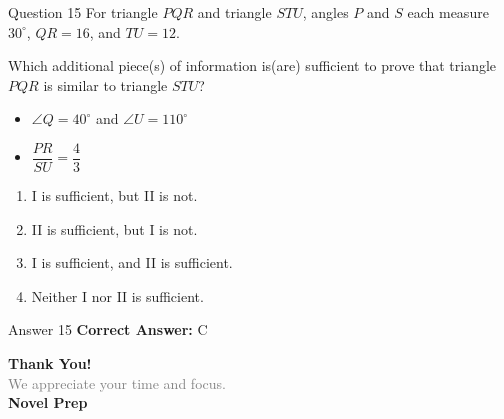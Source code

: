 \documentclass{beamer}
\begin{document}
\begin{frame}{Question 15}
\small
For triangle \(PQR\) and triangle \(STU\), angles \(P\) and \(S\) each measure \(30^\circ\), \(QR = 16\), and \(TU = 12\).

Which additional piece(s) of information is(are) sufficient to prove that triangle \(PQR\) is similar to triangle \(STU\)?

\begin{itemize}
\item[I] \(\angle Q = 40^\circ\) and \(\angle U = 110^\circ\)
\item[II] \(\dfrac{PR}{SU} = \dfrac{4}{3}\)
\end{itemize}
\vspace{0.35cm}
\begin{enumerate}
    \item[A.] I is sufficient, but II is not.
    \item[B.] II is sufficient, but I is not.
    \item[C.] I is sufficient, and II is sufficient.
    \item[D.] Neither I nor II is sufficient.
\end{enumerate}
\end{frame}
\begin{frame}{Answer 15}
\small
\textbf{Correct Answer:} C
\end{frame}

\begin{frame}{}
    \centering
    \vspace{5em}
    {\Huge \textbf{\textcolor{novelPurple}{Thank You!}}} \\[1em]
    {\large \textcolor{gray}{We appreciate your time and focus.}} \\[3em]
    {\LARGE \textbf{\textcolor{novelPurple}{\textsf{Novel Prep}}}}
    \vfill
\end{frame}
\end{document}
